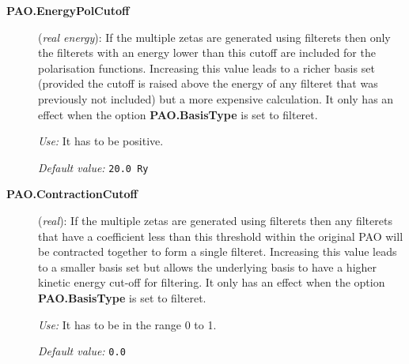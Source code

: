 \begin{description}
\item[\textbf{PAO.EnergyPolCutoff}] (\textit{real energy}): If the multiple
zetas are generated using filterets then only the filterets with
an energy lower than this cutoff are included for the polarisation
functions. Increasing this value leads to a richer basis set 
(provided the cutoff is raised above the energy of any filteret 
that was previously not included) but a more expensive calculation.
It only has an effect when the option
\textbf{PAO.BasisType} is set to filteret.

\textit{Use:} It has to be positive.

\textit{Default value:} \texttt{20.0 Ry}
\end{description}

\begin{description}
\item[\textbf{PAO.ContractionCutoff}] (\textit{real}): If the multiple
zetas are generated using filterets then any filterets that have
a coefficient less than this threshold within the original PAO
will be contracted together to form a single filteret.
Increasing this value leads to a smaller basis set but allows
the underlying basis to have a higher kinetic energy cut-off for
filtering. It only has an effect when the option
\textbf{PAO.BasisType} is set to filteret.

\textit{Use:} It has to be in the range 0 to 1.

\textit{Default value:} \texttt{0.0}
\end{description}

